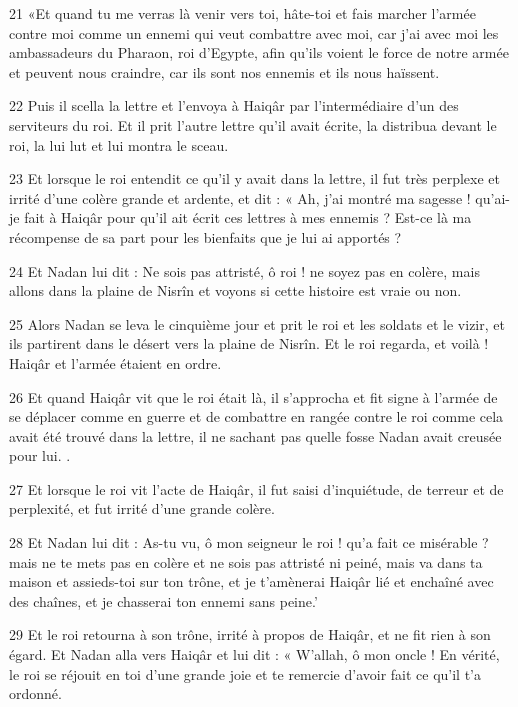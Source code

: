 \par 21 «Et quand tu me verras là venir vers toi, hâte-toi et fais marcher l'armée contre moi comme un ennemi qui veut combattre avec moi, car j'ai avec moi les ambassadeurs du Pharaon, roi d'Egypte, afin qu'ils voient le force de notre armée et peuvent nous craindre, car ils sont nos ennemis et ils nous haïssent.

\par 22 Puis il scella la lettre et l'envoya à Haiqâr par l'intermédiaire d'un des serviteurs du roi. Et il prit l'autre lettre qu'il avait écrite, la distribua devant le roi, la lui lut et lui montra le sceau.

\par 23 Et lorsque le roi entendit ce qu'il y avait dans la lettre, il fut très perplexe et irrité d'une colère grande et ardente, et dit : « Ah, j'ai montré ma sagesse ! qu'ai-je fait à Haiqâr pour qu'il ait écrit ces lettres à mes ennemis ? Est-ce là ma récompense de sa part pour les bienfaits que je lui ai apportés ?

\par 24 Et Nadan lui dit : Ne sois pas attristé, ô roi ! ne soyez pas en colère, mais allons dans la plaine de Nisrîn et voyons si cette histoire est vraie ou non.

\par 25 Alors Nadan se leva le cinquième jour et prit le roi et les soldats et le vizir, et ils partirent dans le désert vers la plaine de Nisrîn. Et le roi regarda, et voilà ! Haiqâr et l’armée étaient en ordre.

\par 26 Et quand Haiqâr vit que le roi était là, il s'approcha et fit signe à l'armée de se déplacer comme en guerre et de combattre en rangée contre le roi comme cela avait été trouvé dans la lettre, il ne sachant pas quelle fosse Nadan avait creusée pour lui. .

\par 27 Et lorsque le roi vit l'acte de Haiqâr, il fut saisi d'inquiétude, de terreur et de perplexité, et fut irrité d'une grande colère.

\par 28 Et Nadan lui dit : As-tu vu, ô mon seigneur le roi ! qu'a fait ce misérable ? mais ne te mets pas en colère et ne sois pas attristé ni peiné, mais va dans ta maison et assieds-toi sur ton trône, et je t'amènerai Haiqâr lié et enchaîné avec des chaînes, et je chasserai ton ennemi sans peine.'

\par 29 Et le roi retourna à son trône, irrité à propos de Haiqâr, et ne fit rien à son égard. Et Nadan alla vers Haiqâr et lui dit : « W'allah, ô mon oncle ! En vérité, le roi se réjouit en toi d'une grande joie et te remercie d'avoir fait ce qu'il t'a ordonné.

